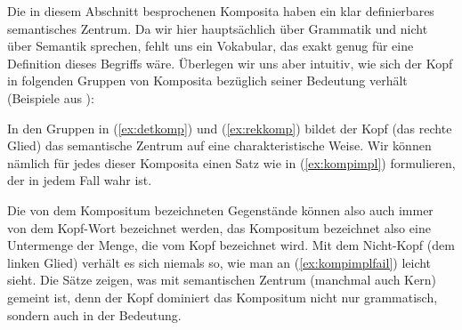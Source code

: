 
Die in diesem Abschnitt besprochenen Komposita haben ein klar definierbares semantisches Zentrum.
Da wir hier hauptsächlich über Grammatik und nicht über Semantik sprechen, fehlt uns ein Vokabular, das exakt genug für eine Definition dieses Begriffs wäre.
Überlegen wir uns aber intuitiv, wie sich der Kopf in folgenden Gruppen von Komposita bezüglich seiner Bedeutung verhält (Beispiele aus \citealp[217ff.]{Eisenberg1}):

\begin{exe}
\end{exe}

In den Gruppen in (\ref{ex:detkomp}) und (\ref{ex:rekkomp}) bildet der Kopf (das rechte Glied) das semantische Zentrum auf eine charakteristische Weise.
Wir können nämlich für jedes dieser Komposita einen Satz wie in (\ref{ex:kompimpl}) formulieren, der in jedem Fall wahr ist.

\begin{exe}
  \begin{xlist}
  \end{xlist}
\end{exe}

Die von dem Kompositum bezeichneten Gegenstände können also auch immer von dem Kopf-Wort bezeichnet werden, das Kompositum bezeichnet also eine Untermenge der Menge, die vom Kopf bezeichnet wird.
Mit dem Nicht-Kopf (dem linken Glied) verhält es sich niemals so, wie man an (\ref{ex:kompimplfail}) leicht sieht.
Die Sätze zeigen, was mit semantischen Zentrum (manchmal auch Kern) gemeint ist, denn der Kopf dominiert das Kompositum nicht nur grammatisch, sondern auch in der Bedeutung.

\begin{exe}
  \begin{xlist}
  \end{xlist}
\end{exe}

